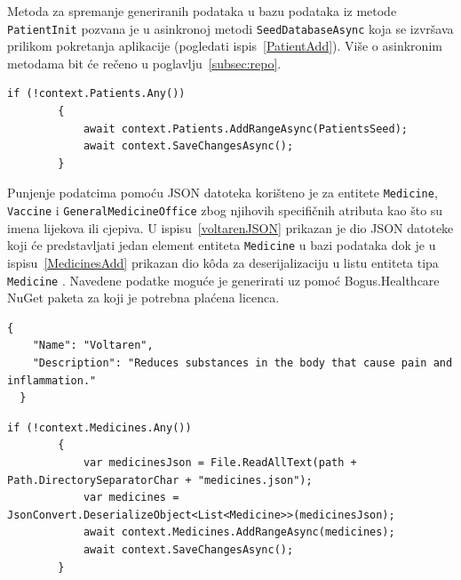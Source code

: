 Metoda za spremanje generiranih podataka u bazu podataka iz metode \\\texttt{PatientInit} pozvana je u asinkronoj metodi \texttt{SeedDatabaseAsync} koja se izvršava prilikom pokretanja aplikacije (pogledati ispis~\ref{PatientAdd}). Više o asinkronim metodama bit će rečeno u poglavlju~\ref{subsec:repo}.

\begin{lstlisting}[caption={\texttt{AddRangeAsync} metoda za spremanje generiranih podataka}, label=PatientAdd]
if (!context.Patients.Any())
        {
            await context.Patients.AddRangeAsync(PatientsSeed);
            await context.SaveChangesAsync();
        }
\end{lstlisting}

Punjenje podatcima pomoću JSON datoteka korišteno je za entitete \texttt{Medicine},\\\texttt{Vaccine} i \texttt{GeneralMedicineOffice} zbog njihovih specifičnih atributa kao što su imena lijekova ili cjepiva. U ispisu~\ref{voltarenJSON} prikazan je dio JSON datoteke koji će predstavljati jedan element entiteta \texttt{Medicine} u bazi podataka dok je u ispisu~\ref{MedicinesAdd} prikazan dio k\^oda za deserijalizaciju u listu entiteta tipa \texttt{Medicine} . Navedene podatke moguće je generirati uz pomoć Bogus.Healthcare NuGet paketa za koji je potrebna plaćena licenca.

\begin{lstlisting}[caption={Dio JSON datoteke koji će predstavljati jedan element entiteta \texttt{Medicine} u bazi podataka}, label=voltarenJSON]
  {
    "Name": "Voltaren",
    "Description": "Reduces substances in the body that cause pain and inflammation."
  }
\end{lstlisting}

\begin{lstlisting}[caption={Punjenje tablice \texttt{Medicine} podatcima iz JSON datoteke}, label=MedicinesAdd]
        if (!context.Medicines.Any())
        {
            var medicinesJson = File.ReadAllText(path + Path.DirectorySeparatorChar + "medicines.json");
            var medicines = JsonConvert.DeserializeObject<List<Medicine>>(medicinesJson);
            await context.Medicines.AddRangeAsync(medicines);
            await context.SaveChangesAsync();
        }
\end{lstlisting}


